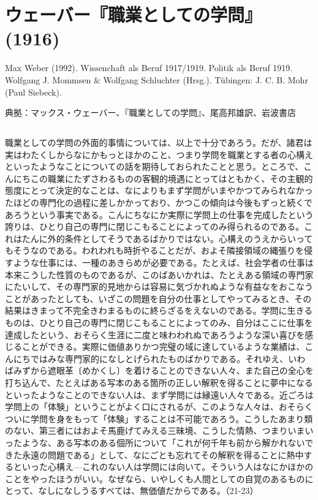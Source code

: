\section{ウェーバー『職業としての学問』(1916)}



Max Weber (1992). Wissenchaft als Beruf 1917/1919. Politik als Beruf 1919. Wolfgang J. Mommsen \& Wolfgang Schluchter (Hrsg.). Tübingen: J. C. B. Mohr (Paul Siebeck). 

典拠：マックス・ウェーバー、『職業としての学問』、尾高邦雄訳、岩波書店

\subsection{}



職業としての学問の外面的事情については、以上で十分であろう。だが、諸君は実はわたくしからなにかもっとほかのこと、つまり学問を職業とする者の心構えといったようなことについての話を期待しておられたことと思う。ところで、こんにちこの職業にたずさわるものの客観的境遇にとってはともかく、その主観的態度にとって決定的なことは、なによりもまず学問がいまやかつてみられなかったほどの専門化の過程に差しかかっており、かつこの傾向は今後もずっと続くであろうという事実である。こんにちなにか実際に学問上の仕事を完成したという誇りは、ひとり自己の専門に閉じこもることによってのみ得られるのである。これはたんに外的条件としてそうであるばかりではない。心構えのうえからいってもそうなのである。われわれも時折やることだが、およそ隣接領域の縄張りを侵すような仕事には、一種のあきらめが必要である。たとえば、社会学者の仕事は本来こうした性質のものであるが、このばあいかれは、たとえある領域の専門家にたいして、その専門家的見地からは容易に気づかれぬような有益なをおこなうことがあったとしても、いざこの問題を自分の仕事としてやってみるとき、その結果はきまって不完全きわまるものに終らざるをえないのである。学問に生きるものは、ひとり自己の専門に閉じこもることによってのみ、自分はここに仕事を達成したという、おそらく生涯に二度と味わわれぬであろうような深い喜びを感じることができる。実際に価値ありかつ完璧の域に達しているような業績は、こんにちではみな専門家的になしとげられたものばかりである。それゆえ、いわばみずから遮眼革〔めかくし〕を着けることのできない人々、また自己の全心を打ち込んで、たとえばある写本のある箇所の正しい解釈を得ることに夢中になるといったようなことのできない人は、まず学問には縁遠い人々である。近ごろは学問上の「体験」ということがよく口にされるが、このような人々は、おそらくついに学問を身をもって「体験」することは不可能であろう。こうしたあまり類のない、第三者にはおよそ馬鹿げてみえる三昧境、こうした情熱、つまりいまいったような、ある写本のある個所について「これが何千年も前から解かれないできた永遠の問題である」として、なにごとも忘れてその解釈を得ることに熱中するといった心構え{\——}これのない人は学問には向いて。そういう人はなにかほかのことをやったほうがいい。なぜなら、いやしくも人間としての自覚のあるものにとって、なしになしうるすべては、無価値だからである。（21-23）


